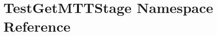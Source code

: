 \hypertarget{namespaceTestGetMTTStage}{\section{Test\-Get\-M\-T\-T\-Stage Namespace Reference}
\label{namespaceTestGetMTTStage}
}
